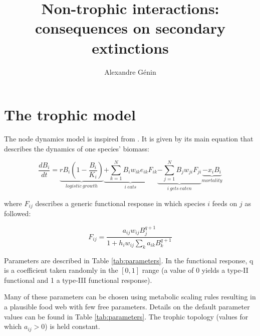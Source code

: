 \documentclass[a4paper,11pt]{article}
\title{Non-trophic interactions: consequences on secondary extinctions}
\author{Alexandre Génin}
\begin{document}
  
  \maketitle 
  
  \section{The trophic model}
      
      
      The node dynamics model is inspired from \autocite{Brose2006}. It is 
given by its main equation that describes the dynamics of one species' biomass: 
    
    \begin{equation}
      \label{eq:popdyn}
      \frac{dB_i}{dt} = \underbrace{rB_i(1 - \frac{B_i}{K_i})}_{logistic\ growth}
                        \underbrace{+ \sum_{k=1}^{N} B_i w_{ik} e_{ik} F_{ik}}_{i\ eats}
                        \underbrace{- \sum_{j=1}^{N} B_j w_{ji} F_{ji}}_{i\ gets\ eaten}
                        \underbrace{- x_i B_i}_{mortality}
    \end{equation}
    
    where $F_{ij}$ describes a generic functional response in which species $i$ 
feeds on $j$ as followed: 
    
    \begin{equation}
      F_{ij} = \frac{a_{ij} w_{ij} B_{j}^{q+1} }{ 
                       1 + h_{i} w_{ij} \sum_{k} a_{ik} B_{k}^{q+1} }
    \end{equation}
    
    Parameters are described in Table \ref{tab:parameters}. In the functional 
response, q is a coefficient taken randomly in the $[0,1]$ range (a value of 0 
yields a type-II functional and 1 a type-III functional response).
    
    Many of these parameters can be chosen using metabolic scaling rules 
resulting in a plausible food web with few free parameters. Details on the 
default parameter values can be found in Table \ref{tab:parameters}. The trophic 
topology (values for which $a_{ij}>0$) is held constant.
    
\end{document}
